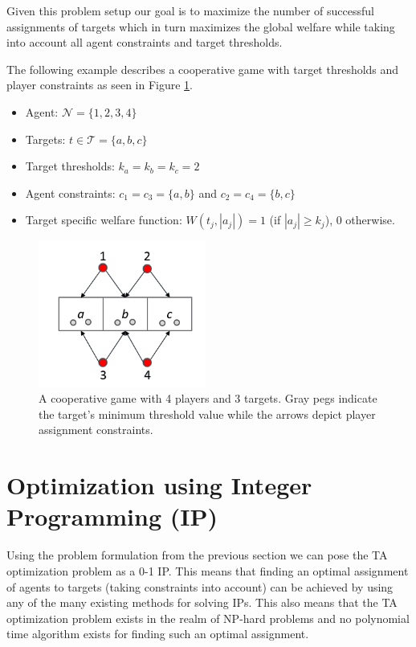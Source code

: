\documentclass[11pt, onecolumn, compsoc, letterpaper]{article}
\newcommand{\Pl}{\mathcal{N}} %
\newcommand{\Ta}{\mathcal{T}} %
\begin{document}
Given this problem setup our goal is to maximize the number of successful assignments of targets which in turn maximizes the global welfare while taking into account all agent constraints and target thresholds.

The following example describes a cooperative game with target thresholds and player constraints as seen in Figure \ref{fig:ex1}.
\begin{itemize}
	\item Agent: $\Pl = \{1,2,3,4\}$
	\item Targets: $t \in \Ta = \{a, b, c\}$
	\item Target thresholds: $k_a = k_b = k_c = 2$
	\item Agent constraints: $c_1 = c_3 = \{a, b\}$ and $c_2 = c_4 = \{b, c\}$
	\item Target specific welfare function: $W(t_j, |a_j|) = 1$ (if $|a_j| \geq k_j$), $0$ otherwise.
	
\end{itemize}
\begin{figure}[!htb]
	\centering\includegraphics[width=5.5cm]{assets/ex1.png}
	\centering\caption{A cooperative game with 4 players and 3 targets. Gray pegs indicate the target's minimum threshold value while the arrows depict player assignment constraints.}\label{fig:ex1}
\end{figure}

\section{Optimization using Integer Programming (IP)}
Using the problem formulation from the previous section we can pose the TA optimization problem as a 0-1 IP. This means that finding an optimal assignment of agents to targets (taking constraints into account) can be achieved by using any of the many existing methods for solving IPs. This also means that the TA optimization problem exists in the realm of NP-hard problems and no polynomial time algorithm exists for finding such an optimal assignment. 
\end{document}
